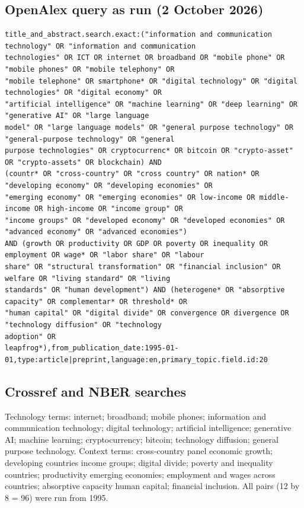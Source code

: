 \subsection*{OpenAlex query as run (2 October 2026)}
{\fontsize{6.6}{7.6}\selectfont\begin{verbatim}
title_and_abstract.search.exact:("information and communication technology" OR "information and communication
technologies" OR ICT OR internet OR broadband OR "mobile phone" OR "mobile phones" OR "mobile telephony" OR
"mobile telephone" OR smartphone* OR "digital technology" OR "digital technologies" OR "digital economy" OR
"artificial intelligence" OR "machine learning" OR "deep learning" OR "generative AI" OR "large language
model" OR "large language models" OR "general purpose technology" OR "general-purpose technology" OR "general
purpose technologies" OR cryptocurrenc* OR bitcoin OR "crypto-asset" OR "crypto-assets" OR blockchain) AND
(countr* OR "cross-country" OR "cross country" OR nation* OR "developing economy" OR "developing economies" OR
"emerging economy" OR "emerging economies" OR low-income OR middle-income OR high-income OR "income group" OR
"income groups" OR "developed economy" OR "developed economies" OR "advanced economy" OR "advanced economies")
AND (growth OR productivity OR GDP OR poverty OR inequality OR employment OR wage* OR "labor share" OR "labour
share" OR "structural transformation" OR "financial inclusion" OR welfare OR "living standard" OR "living
standards" OR "human development") AND (heterogene* OR "absorptive capacity" OR complementar* OR threshold* OR
"human capital" OR "digital divide" OR convergence OR divergence OR "technology diffusion" OR "technology
adoption" OR
leapfrog*),from_publication_date:1995-01-01,type:article|preprint,language:en,primary_topic.field.id:20
\end{verbatim}}

\subsection*{Crossref and NBER searches}
Technology terms: internet; broadband; mobile phones; information and communication technology; digital technology; artificial intelligence; generative AI; machine learning; cryptocurrency; bitcoin; technology diffusion; general purpose technology. Context terms: cross-country panel economic growth; developing countries income groups; digital divide; poverty and inequality countries; productivity emerging economies; employment and wages across countries; absorptive capacity human capital; financial inclusion. All pairs (12 by 8 = 96) were run from 1995.

